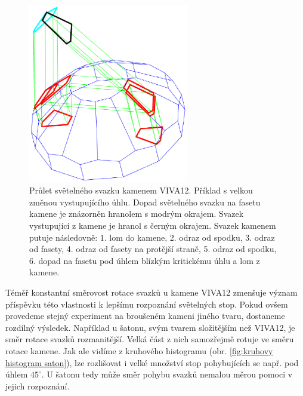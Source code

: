 \begin{figure}[h!]
\begin{center}
\includegraphics[width = 7cm]{figures/odraz.eps}
\end{center}
\caption{Průlet světelného svazku kamenem VIVA12. Příklad s velkou změnou vystupujícího úhlu. Dopad světelného svazku na fasetu kamene je znázorněn hranolem s modrým okrajem. Svazek vystupující z kamene je hranol s černým okrajem. Svazek kamenem putuje následovně: 1. lom do kamene, 2. odraz od spodku, 3. odraz od fasety, 4. odraz od fasety na protější straně, 5. odraz od spodku, 6. dopad na fasetu pod úhlem blízkým kritickému úhlu a lom z kamene.}

\label{fig:odrazy v kamenu}
\end{figure}
\newpage

Téměř konstantní směrovost rotace svazků u kamene VIVA12 zmenšuje význam příspěvku této vlastnosti k lepšímu rozpoznání světelných stop. Pokud ovšem provedeme stejný experiment na broušeném kameni jiného tvaru, dostaneme rozdílný výsledek. Například u šatonu, svým tvarem složitějším než VIVA12, je směr rotace svazků rozmanitější. Velká část z nich samozřejmě rotuje ve směru rotace kamene. Jak ale vidíme z kruhového histogramu (obr. \ref{fig:kruhovy histogram saton}), lze rozlišovat i velké množství stop pohybujících se např. pod úhlem $45^\circ$. U šatonu tedy může směr pohybu svazků nemalou měrou pomoci v jejich rozpoznání. 

